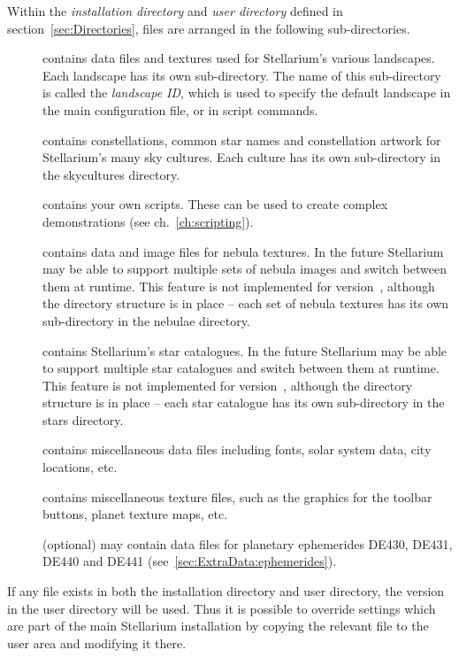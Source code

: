 Within the \emph{installation directory} and \emph{user directory}
defined in section~\ref{sec:Directories}, files are arranged in the
following sub-directories.

\begin{description}
\item[] contains data files and textures used for
  Stellarium's various landscapes. Each landscape has its own
  sub-directory. The name of this sub-directory is called the
  \emph{landscape ID}, which is used to specify the default landscape in
  the main configuration file, or in script commands.
\item[] contains constellations, common star names and
  constellation artwork for Stellarium's many sky cultures. Each culture
  has its own sub-directory in the skycultures directory.
\item[] contains your own scripts. These can be used to create
  complex demonstrations (see ch.~\ref{ch:scripting}). 
\item[] contains data and image files for nebula textures.
  In the future Stellarium may be able to support multiple sets of nebula
  images and switch between them at runtime. This feature is not
  implemented for version~\StelVersion, although the directory structure is in
  place -- each set of nebula textures has its own sub-directory in the
  nebulae directory.
\item[] contains Stellarium's star catalogues. In the
  future Stellarium may be able to support multiple star catalogues
  and switch between them at runtime. This feature is not implemented
  for version~\StelVersion, although the directory structure is in
  place -- each star catalogue has its own sub-directory in the stars
  directory.
\item[] contains miscellaneous data files including fonts,
  solar system data, city locations, etc.
\item[] contains miscellaneous texture files, such as the
  graphics for the toolbar buttons, planet texture maps, etc.
\item[] (optional) may contain data files for planetary
  ephemerides DE430, DE431, DE440 and DE441 (see~\ref{sec:ExtraData:ephemerides}).
\end{description}

If any file exists in both the installation directory and user
directory, the version in the user directory will be used. Thus it is
possible to override settings which are part of the main Stellarium
installation by copying the relevant file to the user area and modifying
it there.

